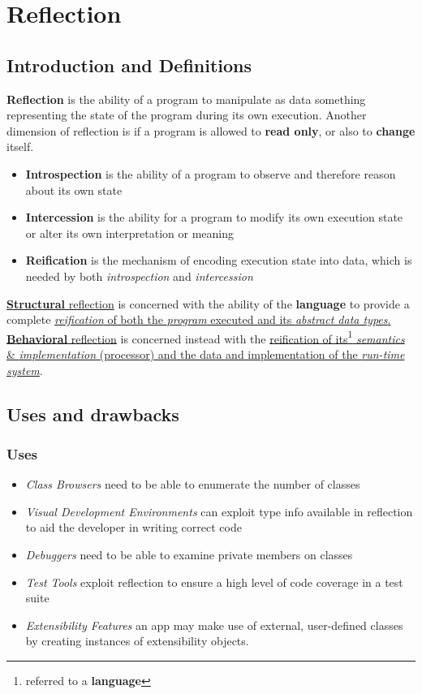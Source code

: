 \chapter{Reflection}
\section{Introduction and Definitions}

\textbf{Reflection} is the ability of a program to manipulate as data something representing the state of the program during its own execution.
Another dimension of reflection is if a program is
allowed to \textbf{read only}, or also to \textbf{change} itself.
\begin{itemize}
    \item \textbf{Introspection} is the ability of a program to observe and
    therefore reason about its own state
    \item \textbf{Intercession} is the ability for a program to modify its
    own execution state or alter its own interpretation or
    meaning
    \item \textbf{Reification} is the mechanism of encoding execution state into data, which is needed by both \textit{introspection} and \textit{intercession}
\end{itemize}

\ul{\textbf{Structural} reflection}  is concerned with the ability of the \textbf{language} to provide a complete \ul{\textit{reification} of both the \textit{program} executed and its \textit{abstract data types}.}\\
\ul{\textbf{Behavioral} reflection} is concerned instead with the \ul{reification of its\footnote{referred to a \textbf{language}} \textit{semantics} \& \textit{implementation} (processor) and the data and implementation of the \textit{run-time system}}.

\section{Uses and drawbacks}
\subsection{Uses}
\begin{itemize}
    \item \textit{Class Browsers} need to be able to enumerate the number of classes
    \item \textit{Visual Development Environments} can exploit type info available in reflection to aid the developer in writing correct code
    \item \textit{Debuggers} need to be able to examine private members on classes
    \item \textit{Test Tools} exploit reflection to ensure a high level of code coverage in a test suite
    \item \textit{Extensibility Features} an app may make use of external, user-defined classes by creating instances of extensibility objects.
\end{itemize}

